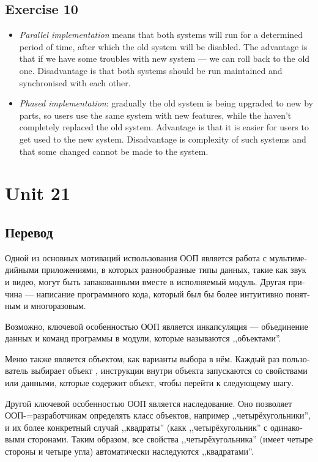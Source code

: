 \documentclass[a5paper,10pt,notitlepage,pdftex,headsepline]{scrartcl}
\begin{document}
  \subsection{Exercise 10}
    \begin{itemize}
      \item \textit{Parallel implementation} means that both systems will run
        for a determined period of time, after which the old system will be
        disabled.
        The advantage is that if we have some troubles with new system --- we can
        roll back to the old one.
        Disadvantage is that both systems should be run maintained and
        synchronised with each other.
      \item \textit{Phased implementation}: gradually the old system is being
        upgraded to new by parts, so users use the same system with new
        features, while the haven't completely replaced the old system.
        Advantage is that it is easier for users to get used to the new
        system.
        Disadvantage is complexity of such systems and that some changed
        cannot be made to the system.
    \end{itemize}
\section{Unit 21}
  \subsection{Перевод}
    \begin{otherlanguage}{russian}
      Одной из основных мотиваций использования ООП является работа с
      мультимедийными приложениями, в которых разнообразные типы данных, такие
      как звук и видео, могут быть запакованными вместе в исполняемый модуль.
      Другая причина --- написание программного кода, который был бы более
      интуитивно понятным и многоразовым.

      Возможно, ключевой особенностью ООП является инкапсуляция --- объединение
      данных и команд программы в модули, которые называются ,,объектами''.

      Меню также является объектом, как варианты выбора в нём.
      Каждый раз пользователь выбирает объект , инструкции внутри объекта
      запускаются со свойствами или данными, которые содержит объект, чтобы
      перейти к следующему шагу.

      Другой ключевой особенностью ООП является наследование.
      Оно позволяет ООП-=разработчикам определять класс объектов, например
      ,,четырёхугольники'', и их более конкретный случай ,,квадраты'' (какк
      ,,четырёхугольник'' с одинаковыми сторонами.
      Таким образом, все свойства ,,четырёхугольника'' (имеет четыре стороны и
      четыре угла) автоматически наследуются ,,квадратами''.

    \end{otherlanguage}
\end{document}
